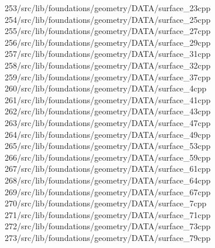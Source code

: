 \begin{tabbing}
253\>/src/lib/foundations/geometry/DATA/surface\_23cpp\\[0pt]
254\>/src/lib/foundations/geometry/DATA/surface\_25cpp\\[0pt]
255\>/src/lib/foundations/geometry/DATA/surface\_27cpp\\[0pt]
256\>/src/lib/foundations/geometry/DATA/surface\_29cpp\\[0pt]
257\>/src/lib/foundations/geometry/DATA/surface\_31cpp\\[0pt]
258\>/src/lib/foundations/geometry/DATA/surface\_32cpp\\[0pt]
259\>/src/lib/foundations/geometry/DATA/surface\_37cpp\\[0pt]
260\>/src/lib/foundations/geometry/DATA/surface\_4cpp\\[0pt]
261\>/src/lib/foundations/geometry/DATA/surface\_41cpp\\[0pt]
262\>/src/lib/foundations/geometry/DATA/surface\_43cpp\\[0pt]
263\>/src/lib/foundations/geometry/DATA/surface\_47cpp\\[0pt]
264\>/src/lib/foundations/geometry/DATA/surface\_49cpp\\[0pt]
265\>/src/lib/foundations/geometry/DATA/surface\_53cpp\\[0pt]
266\>/src/lib/foundations/geometry/DATA/surface\_59cpp\\[0pt]
267\>/src/lib/foundations/geometry/DATA/surface\_61cpp\\[0pt]
268\>/src/lib/foundations/geometry/DATA/surface\_64cpp\\[0pt]
269\>/src/lib/foundations/geometry/DATA/surface\_67cpp\\[0pt]
270\>/src/lib/foundations/geometry/DATA/surface\_7cpp\\[0pt]
271\>/src/lib/foundations/geometry/DATA/surface\_71cpp\\[0pt]
272\>/src/lib/foundations/geometry/DATA/surface\_73cpp\\[0pt]
273\>/src/lib/foundations/geometry/DATA/surface\_79cpp\\[0pt]

\end{tabbing}
